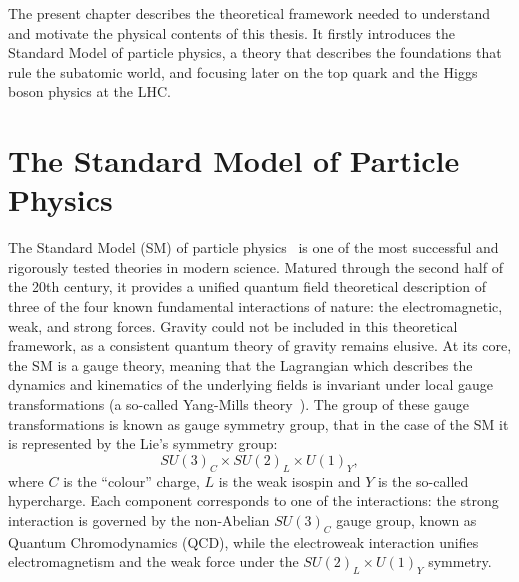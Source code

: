 The present chapter describes the theoretical framework needed to understand and motivate the physical contents of this thesis. 
It firstly introduces the Standard Model of particle physics, a theory that describes the foundations that rule the subatomic world, and focusing later on the top quark and the Higgs boson physics at the LHC.

\section{The Standard Model of Particle Physics}
\label{sec:SM_intro}
The Standard Model (SM) of particle physics~\cite{Glashow,Weinberg,Salam} is one of the most successful and rigorously tested theories in modern science. Matured through the second half of the 20th century, it provides a unified quantum field theoretical description of three of the four known fundamental interactions of nature: the electromagnetic, weak, and strong forces. Gravity could not be included in this theoretical framework, as a consistent quantum theory of gravity remains elusive. 
At its core, the SM is a gauge theory, meaning that the Lagrangian which describes the dynamics and kinematics of the underlying fields is invariant under local gauge transformations (a so-called Yang-Mills theory~\cite{YMills}). The group of these gauge transformations is known as gauge symmetry group, that in the case of the SM it is represented by the Lie's symmetry group:
\begin{equation}
    SU(3)_C \times SU(2)_L \times U(1)_Y,
\end{equation}
where $C$ is the ``colour'' charge, $L$ is the weak isospin and $Y$ is the so-called hypercharge. Each component corresponds to one of the interactions: the strong interaction is governed by the non-Abelian $SU(3)_C$ gauge group, known as Quantum Chromodynamics (QCD), while the electroweak interaction unifies electromagnetism and the weak force under the $SU(2)_L \times U(1)_Y$ symmetry.


